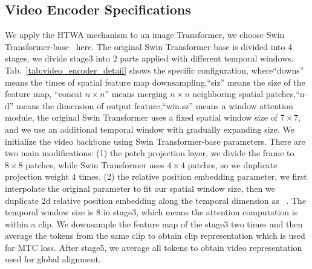 \documentclass{article}
\begin{document}
\subsection{Video Encoder Specifications}
We apply the HTWA mechanism to an image Transformer, we choose Swin Transformer-base~\cite{liu2021swin} here. The original Swin Transformer base is divided into 4 stages, we divide stage3 into 2 parts applied with different temporal windows. Tab.~\ref{tab:video_encoder_detail} shows the specific configuration, where``downs'' means the times of spatial feature map downsampling,``siz'' means the size of the feature map, ``concat $n \times n$'' means merging $n \times n$ neighboring spatial patches,``n-d'' means the dimension of output feature,``win.sz'' means a window attention module, the original Swin Transformer uses a fixed spatial window size of $7 \times 7$, and we use an additional temporal window with gradually expanding size.
We initialize the video backbone using Swin Transformer-base parameters. There are two main modifications: (1) the patch projection layer, we divide the frame to $8 \times 8$ patches, while Swin Transformer uses $4 \times 4$ patches, so we duplicate projection weight 4 times. (2) the relative position embedding parameter, we first interpolate the original parameter to fit our spatial window size, then we duplicate 2d relative position embedding along the temporal dimension as ~\cite{liu2021videoswin}.
The temporal window size is 8 in stage3, which means the attention computation is within a clip. We downsample the feature map of the stage3 two times and then average the tokens from the same clip to obtain clip representation which is used for MTC loss. After stage5, we average all tokens to obtain video representation used for global alignment.
\end{document}

